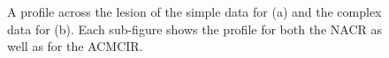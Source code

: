 \documentclass[10pt, twocolumn, twoside, letterpaper]{IEEEtran}
\begin{document}
    \begin{figure}
        \centering
        \captionsetup{singlelinecheck=false, justification=centering}
        \caption{A profile across the lesion of the simple data for (a) and the complex data for (b). Each sub-figure shows the profile for both the \gls{NACR} as well as for the \gls{ACMCIR}.}
        \label{fig:profile}
    \end{figure}
    
\end{document}

